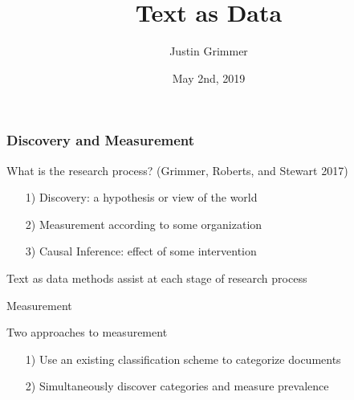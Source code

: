 \documentclass{beamer}
\title[Text as Data] %
{Text as Data}
\author{Justin Grimmer}
\institute[Stanford University]{Professor\\Department of Political Science \\  Stanford University}
\date{May 2nd, 2019}%
\numberwithin{equation}{section}
\begin{document}
\begin{frame}
\titlepage
\end{frame}



\begin{frame}
\frametitle{Discovery and Measurement}

What is the research process? (Grimmer, Roberts, and Stewart 2017)

\begin{itemize}
  \item[1)] \alert{Discovery}: a hypothesis or view of the world
  \item[2)] \alert{Measurement} according to some organization
  \item[3)] \alert{Causal Inference}: effect of some intervention
\end{itemize}

Text as data methods assist at each stage of research process

\end{frame}



\begin{frame}

\huge

Measurement


\end{frame}


\begin{frame}

Two approaches to measurement
\begin{itemize}
\item[1)] Use an existing classification scheme to categorize documents 
\item[2)] Simultaneously discover categories and measure prevalence 
\end{itemize}



\end{frame}







\end{document}
